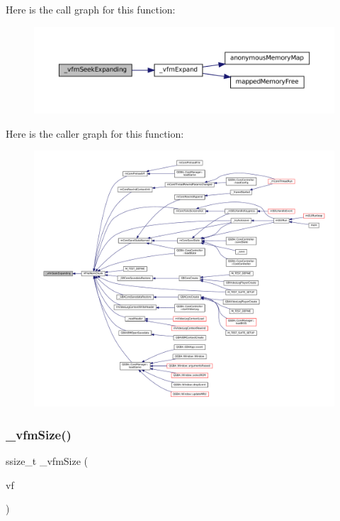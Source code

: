 Here is the call graph for this function\+:
\nopagebreak
\begin{figure}[H]
\begin{center}
\leavevmode
\includegraphics[width=350pt]{vfs-mem_8c_a64c95798476ef7c379ec749c009d1de5_cgraph}
\end{center}
\end{figure}
Here is the caller graph for this function\+:
\nopagebreak
\begin{figure}[H]
\begin{center}
\leavevmode
\includegraphics[width=350pt]{vfs-mem_8c_a64c95798476ef7c379ec749c009d1de5_icgraph}
\end{center}
\end{figure}
\mbox{\label{vfs-mem_8c_acf696d7e820407942040897ac462989b}} 
\subsubsection{\texorpdfstring{\+\_\+vfm\+Size()}{\_vfmSize()}}
{\footnotesize\ttfamily ssize\+\_\+t \+\_\+vfm\+Size (\begin{DoxyParamCaption}\item[{struct V\+File $\ast$}]{vf }\end{DoxyParamCaption})\hspace{0.3cm}{\ttfamily [static]}}

